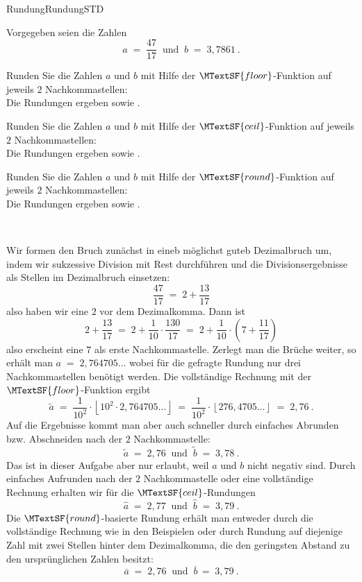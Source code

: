 \begin{MXContent}{Rundung}{Rundung}{STD}
\begin{MExercise}
Vorgegeben seien die Zahlen
$$
a\; =\; \frac{47}{17} \;\;\text{und}\;\;  b\; =\; 3,7861\: .
$$
\begin{MExerciseItems}
\item{Runden Sie die Zahlen $a$ und $b$ mit Hilfe der $\MTextSF{floor}$-Funktion auf jeweils $2$ Nachkommastellen:\\Die Rundungen ergeben
 sowie .}
\item{Runden Sie die Zahlen $a$ und $b$ mit Hilfe der $\MTextSF{ceil}$-Funktion auf jeweils $2$ Nachkommastellen:\\Die Rundungen ergeben
 sowie .}
\item{Runden Sie die Zahlen $a$ und $b$ mit Hilfe der $\MTextSF{round}$-Funktion auf jeweils $2$ Nachkommastellen:\\Die Rundungen ergeben
 sowie .}
\end{MExerciseItems}
\ \\
\begin{MHint}{\iSolution}
Wir formen den Bruch zunächst in eineb möglichst guteb Dezimalbruch um, indem wir sukzessive Division mit Rest durchführen und die Divisionsergebnisse als Stellen im Dezimalbruch einsetzen:
$$
\frac{47}{17} \;=\; 2+\frac{13}{17}
$$
also haben wir eine $2$ vor dem Dezimalkomma. Dann ist
$$
2+\frac{13}{17} \;=\; 2+\frac1{10}\cdot \frac{130}{17} \;=\; 2+\frac1{10}\cdot\left({7+\frac{11}{17}}\right)
$$
also erscheint eine $7$ als erste Nachkommastelle. Zerlegt man die Brüche weiter, so erhält man  $a\;=\;  2,764705\ldots$ wobei für die gefragte Rundung nur drei Nachkommastellen benötigt werden.
Die vollständige Rechnung mit der $\MTextSF{floor}$-Funktion ergibt
$$
\tilde a \;=\; \frac1{10^2}\cdot \left\lfloor{ 10^2\cdot 2,764705\ldots}\right\rfloor \;=\; \frac1{10^2}\cdot \left\lfloor{ 276,4705\ldots}\right\rfloor \;=\;  2,76\: .
$$
Auf die Ergebnisse kommt man aber auch schneller durch einfaches Abrunden bzw. Abschneiden nach der $2$ Nachkommastelle:
$$
\tilde a \;=\; 2,76\;\; \text{und}\;\; \tilde b \;=\; 3,78\: .
$$
Das ist in dieser Aufgabe aber nur erlaubt, weil $a$ und $b$ nicht negativ sind.
Durch einfaches Aufrunden nach der $2$ Nachkommastelle oder eine vollständige Rechnung erhalten wir für die $\MTextSF{ceil}$-Rundungen
$$
\hat a \;=\; 2,77\;\; \text{und}\;\; \hat b \;=\; 3,79\: .
$$
Die $\MTextSF{round}$-basierte Rundung erhält man entweder durch die vollständige Rechnung wie in den Beispielen
oder durch Rundung auf diejenige Zahl mit zwei Stellen hinter dem Dezimalkomma, die den geringsten Abstand zu den ursprünglichen Zahlen besitzt:
$$
\overline{a} \; = \; 2,76 \;\; \text{und}\;\; \overline{b} \,=\; 3,79\: .
$$
\end{MHint}
\end{MExercise}


\end{MXContent}
